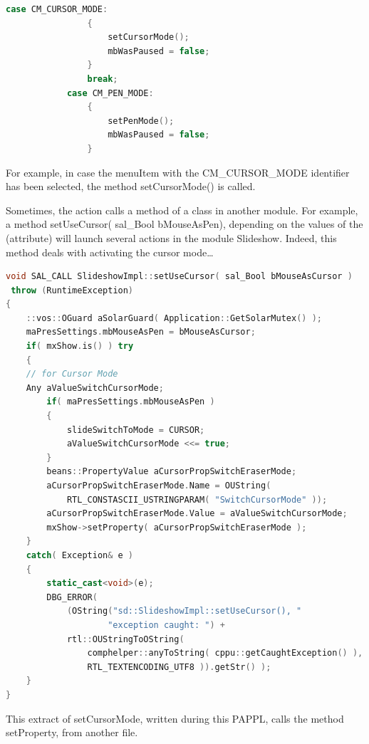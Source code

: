 \documentclass[a4paper,11pt]{article}
\begin{document}
\begin{lstlisting}[language=C++]
            case CM_CURSOR_MODE:
                {
                    setCursorMode();
                    mbWasPaused = false;
                }
                break;
            case CM_PEN_MODE:
                {
                    setPenMode();
                    mbWasPaused = false;
                }
\end{lstlisting}

For example, in case the menuItem with the CM\_CURSOR\_MODE identifier has
been selected, the method setCursorMode() is called.

Sometimes, the action calls a method of a class in another module. For
example, a method setUseCursor( sal\_Bool bMouseAsPen), depending on the
values of the (attribute) will launch several actions in the module Slideshow.
Indeed, this method deals with activating the cursor mode\dots


\begin{lstlisting}[language=C++]
void SAL_CALL SlideshowImpl::setUseCursor( sal_Bool bMouseAsCursor )
 throw (RuntimeException)
{
    ::vos::OGuard aSolarGuard( Application::GetSolarMutex() );
    maPresSettings.mbMouseAsPen = bMouseAsCursor;
    if( mxShow.is() ) try
    {
    // for Cursor Mode
    Any aValueSwitchCursorMode;
        if( maPresSettings.mbMouseAsPen )
        {
            slideSwitchToMode = CURSOR;
            aValueSwitchCursorMode <<= true;
        }
        beans::PropertyValue aCursorPropSwitchEraserMode;
        aCursorPropSwitchEraserMode.Name = OUString( 
        	RTL_CONSTASCII_USTRINGPARAM( "SwitchCursorMode" ));
        aCursorPropSwitchEraserMode.Value = aValueSwitchCursorMode;
        mxShow->setProperty( aCursorPropSwitchEraserMode );
    }
    catch( Exception& e )
    {
        static_cast<void>(e);
        DBG_ERROR(
            (OString("sd::SlideshowImpl::setUseCursor(), "
                    "exception caught: ") +
            rtl::OUStringToOString(
                comphelper::anyToString( cppu::getCaughtException() ),
                RTL_TEXTENCODING_UTF8 )).getStr() );
    }
}
\end{lstlisting}

This extract of setCursorMode, written during this PAPPL, calls the method
setProperty, from another file.
\end{document}
